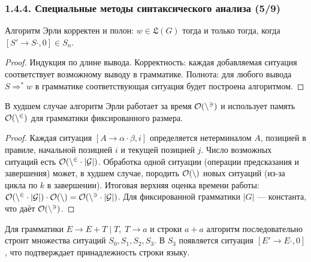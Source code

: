 \begin{frame}
\frametitle{1.4.4. Специальные методы синтаксического анализа (5/9)}
\begin{theorem}
Алгоритм Эрли корректен и полон: $w \in \mathfrak{L}(G)$ тогда и только тогда, когда $[S' \to S \cdot, 0] \in S_n$.
\end{theorem}
\begin{proof}
Индукция по длине вывода. Корректность: каждая добавляемая ситуация соответствует возможному выводу в грамматике. Полнота: для любого вывода $S \Rightarrow^* w$ в грамматике соответствующая ситуация будет построена алгоритмом.
\end{proof}

\begin{theorem}[О сложности]
В худшем случае алгоритм Эрли работает за время $\cal{O}(n^3)$ и использует память $\cal{O}(n^2)$ для грамматики фиксированного размера.
\end{theorem}
\begin{proof}
Каждая ситуация $[A \to \alpha \cdot \beta, i]$ определяется нетерминалом $A$, позицией в правиле, начальной позицией $i$ и текущей позицией $j$. Число возможных ситуаций есть $\cal{O}(n^2 \cdot |G|)$. Обработка одной ситуации (операции предсказания и завершения) может, в худшем случае, породить $\cal{O}(n)$ новых ситуаций (из-за цикла по $k$ в завершении). Итоговая верхняя оценка времени работы: $\cal{O}(n^2 \cdot |G|) \cdot \cal{O}(n) = \cal{O}(n^3 \cdot |G|)$. Для фиксированной грамматики $|G|$ — константа, что даёт $\cal{O}(n^3)$.
\end{proof}

\begin{example}
Для грамматики $E \to E + T \mid T,\; T \to a$ и строки $a+a$ алгоритм последовательно строит множества ситуаций $S_0, S_1, S_2, S_3$. В $S_3$ появляется ситуация $[E' \to E \cdot, 0]$, что подтверждает принадлежность строки языку.
\end{example}
\end{frame}

